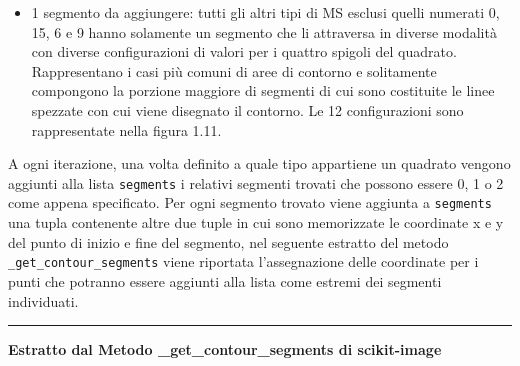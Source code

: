 \documentclass[12pt,a4paper]{report}
\begin{document}
\begin{itemize}
\item 1 segmento da aggiungere: tutti gli altri tipi di MS esclusi quelli numerati 0, 15, 6 e 9 hanno solamente un segmento che li attraversa in diverse modalità con diverse configurazioni di valori per i quattro spigoli del quadrato.  Rappresentano i casi più comuni di aree di contorno e solitamente compongono la porzione maggiore di segmenti di cui sono costituite le linee spezzate con cui viene disegnato il contorno. Le 12 configurazioni sono rappresentate nella figura 1.11.
\begin{figure}[H]
\centering
\begin{floatrow}[1]
\end{floatrow}
\end{figure}

\end{itemize}
A ogni iterazione, una volta definito a quale tipo appartiene un quadrato vengono aggiunti alla lista \verb|segments| i relativi segmenti trovati che possono essere 0, 1 o 2 come appena specificato.  Per ogni segmento trovato viene aggiunta a  \verb|segments| una tupla contenente altre due tuple in cui sono memorizzate le coordinate x e y del punto di inizio e fine del segmento, nel seguente estratto del metodo  \verb|_get_contour_segments| viene riportata l'assegnazione delle coordinate per i punti che potranno essere aggiunti alla lista come estremi dei segmenti individuati.\newpage
\noindent\rule[0.5ex]{\linewidth}{2pt}
\small{\textbf{Estratto dal Metodo \_get\_contour\_segments di scikit-image}} \\
\end{document}
